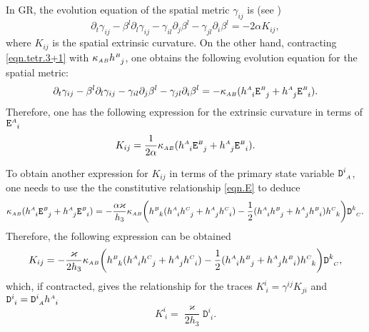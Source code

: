 \documentclass[
10pt, %
a4paper, %
oneside, %
headinclude,footinclude, %
BCOR5mm, %
]{scrartcl}
\newcommand{\sA}{\mathsmaller A}
\newcommand{\sB}{\mathsmaller B}
\newcommand{\sC}{\mathsmaller C}
\newcommand{\pd}[1]{\partial_{#1}}
\newcommand{\mg}[1]{\kappa_{#1}}			%
\newcommand{\tetrsymbol}{h}
\newcommand{\tetr}[2]{\tetrsymbol^{#1}_{\phantom{#1}#2}}
\newcommand{\detTetr}{\tetrsymbol}
\newcommand{\Dfin}[2]{\mathtt{D}_{\phantom{#2}#1}^{#2}}	%
\newcommand{\Efin}[2]{\mathtt{E}^{#1}_{\phantom{#1}#2}}	%
\newcommand{\shift}[1]{\beta^{#1}}
\begin{document}
In GR, the evolution equation of the spatial metric $ \gamma_{ij} $ is (see 
\cite[Eq.(7.64)]{RezzollaZanottiBook})
\begin{equation}\label{eqn.K}
	\pd{t} \gamma_{ij} - \shift{l}\pd{l}\gamma_{ij} - \gamma_{il}\pd{j}\shift{l}
	-\gamma_{jl}\pd{i}\shift{l} = - 2 \alpha K_{ij},
\end{equation}
where  $ K_{ij} $ is the spatial extrinsic 
curvature.
On the other hand, contracting \eqref{eqn.tetr.3+1} with $ \mg{\sA\sB} \tetr{\sB}{j} $, one obtains 
the following evolution equation for the spatial metric:
\begin{equation}\label{eqn.gamma.PDE}
	\pd{t} \gamma_{ij} - \shift{l}\pd{l}\gamma_{ij} - \gamma_{il}\pd{j}\shift{l}
	-\gamma_{jl}\pd{i}\shift{l} = -\mg{\sA\sB}(\tetr{\sA}{i} \Efin{\sB}{j} + \tetr{\sA}{j} 
	\Efin{\sB}{i}).
\end{equation} 
Therefore, one has the following expression for the extrinsic curvature in terms of $ 
\Efin{\sA}{i} $ 
\begin{equation}\label{key}
	K_{ij} = \frac{1}{2\alpha}\mg{\sA\sB}(\tetr{\sA}{i} \Efin{\sB}{j} + \tetr{\sA}{j} 
	\Efin{\sB}{i}).
\end{equation}

To obtain another expression for $ K_{ij} $ in terms of the primary state variable $ \Dfin{\sA}{i} 
$, one needs to use the the constitutive relationship \eqref{eqn.E} to deduce
\begin{equation}
	\mg{\sA\sB} (\tetr{\sA}{i}\Efin{\sB}{j} + \tetr{\sA}{j}\Efin{\sB}{i})
	=
	-\frac{\alpha \varkappa}{\detTetr_3}  \mg{\sA\sB}  \bigg( 
	\tetr{\sB}{k} (\tetr{\sA}{i}\tetr{\sC}{j} + \tetr{\sA}{j}\tetr{\sC}{i})
	-
	\frac12
	(\tetr{\sA}{i}\tetr{\sB}{j} + \tetr{\sA}{j}\tetr{\sB}{i})\tetr{\sC}{k}
	\bigg) \Dfin{\sC}{k}.
\end{equation}
Therefore, the following expression can be obtained
\begin{equation}
	K_{ij} = -\frac{\varkappa}{2 \detTetr_3}\mg{\sA\sB} \bigg( 
	\tetr{\sB}{k} (\tetr{\sA}{i}\tetr{\sC}{j} + \tetr{\sA}{j}\tetr{\sC}{i})
	-
	\frac12
	(\tetr{\sA}{i}\tetr{\sB}{j} + \tetr{\sA}{j}\tetr{\sB}{i})\tetr{\sC}{k}
	\bigg) \Dfin{\sC}{k},
\end{equation}
which, if contracted, gives the relationship for the traces $ K^i_{\ i} = \gamma^{ij}K_{ji} $ and $ 
\Dfin{i}{i} =  \Dfin{\sA}{i}\tetr{\sA}{i} $
\begin{equation}
	K^i_{\ i} = \frac{\varkappa}{2\detTetr_3}\Dfin{i}{i}.
\end{equation}
\end{document}
